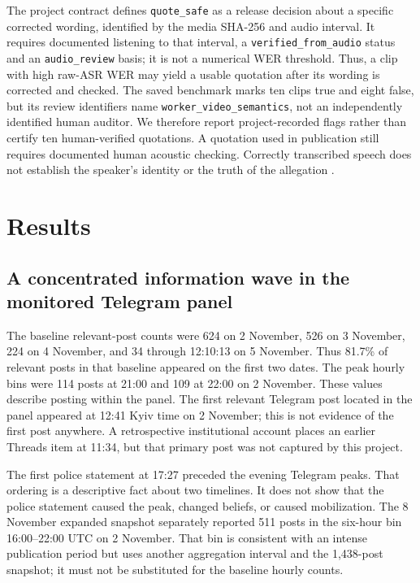 The project contract defines \texttt{quote\_safe} as a release decision about a specific corrected wording, identified by the media SHA-256 and audio interval. It requires documented listening to that interval, a \texttt{verified\_from\_audio} status and an \texttt{audio\_review} basis; it is not a numerical WER threshold. Thus, a clip with high raw-ASR WER may yield a usable quotation after its wording is corrected and checked. The saved benchmark marks ten clips true and eight false, but its review identifiers name \texttt{worker\_video\_semantics}, not an independently identified human auditor. We therefore report project-recorded flags rather than certify ten human-verified quotations. A quotation used in publication still requires documented human acoustic checking. Correctly transcribed speech does not establish the speaker's identity or the truth of the allegation \citep{socialasr2026}.

\section{Results}

\subsection{A concentrated information wave in the monitored Telegram panel}

The baseline relevant-post counts were 624 on 2 November, 526 on 3 November, 224 on 4 November, and 34 through 12:10:13 on 5 November. Thus 81.7\% of relevant posts in that baseline appeared on the first two dates. The peak hourly bins were 114 posts at 21:00 and 109 at 22:00 on 2 November. These values describe posting within the panel. The first relevant Telegram post located in the panel appeared at 12:41 Kyiv time on 2 November; this is not evidence of the first post anywhere. A retrospective institutional account places an earlier Threads item at 11:34, but that primary post was not captured by this project.

The first police statement at 17:27 preceded the evening Telegram peaks. That ordering is a descriptive fact about two timelines. It does not show that the police statement caused the peak, changed beliefs, or caused mobilization. The 8 November expanded snapshot separately reported 511 posts in the six-hour bin 16:00--22:00 UTC on 2 November. That bin is consistent with an intense publication period but uses another aggregation interval and the 1,438-post snapshot; it must not be substituted for the baseline hourly counts.

